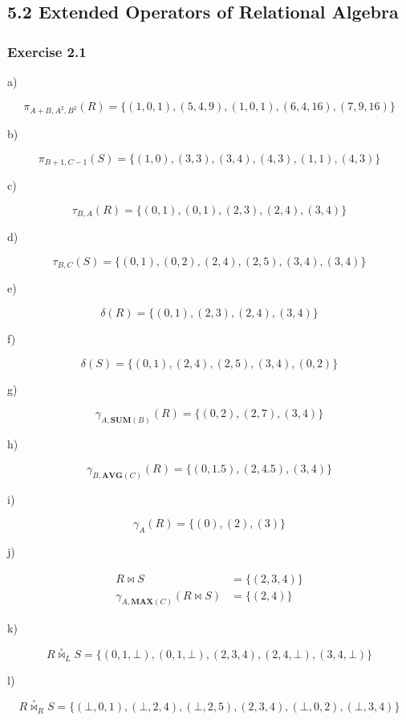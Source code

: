 \documentclass[../../main.tex]{subfiles}
\begin{document}
\subsection*{5.2 Extended Operators of Relational Algebra}

\subsubsection*{Exercise 2.1}

a)

$$
\pi_{A + B, A^2, B^2}(R) = \{(1, 0, 1), (5, 4, 9),
  (1, 0, 1), (6, 4, 16), (7, 9, 16)\}
$$

b)

$$
\pi_{B + 1, C - 1}(S) = \{(1, 0), (3, 3), (3, 4),
  (4, 3), (1, 1), (4, 3)\}
$$

c)

$$
\tau_{B, A}(R) = \{(0, 1), (0, 1), (2, 3),
  (2, 4), (3, 4)\}
$$

d)

$$
\tau_{B, C}(S) = \{(0, 1), (0, 2), (2, 4),
  (2, 5), (3, 4), (3, 4)\}
$$

e)

$$
\delta(R) = \{(0, 1), (2, 3), (2, 4), (3, 4)\}
$$

f)

$$
\delta(S) = \{(0, 1), (2, 4), (2, 5),
  (3, 4), (0, 2)\}
$$

g)

$$
\gamma_{A, \mathbf{SUM}(B)}(R) = \{(0, 2), (2, 7),
  (3, 4)\}
$$

h)

$$
\gamma_{B, \mathbf{AVG}(C)}(R) = \{(0, 1.5), (2, 4.5),
  (3, 4)\}
$$

i)

$$
\gamma_{A}(R) = \{(0), (2), (3)\}
$$

j)

\begin{align*}
  R \bowtie S &= \{(2, 3 , 4)\} \\
  \gamma_{A, \mathbf{MAX}(C)}(R \bowtie S) &= \{(2, 4)\}
\end{align*}

k)

$$
R \overset{\circ}{\bowtie}_{L} S = \{(0, 1, \bot),
  (0, 1, \bot), (2, 3, 4), (2, 4, \bot), (3, 4, \bot)\}
$$

l)

$$
R \overset{\circ}{\bowtie}_{R} S = \{(\bot, 0 , 1),
  (\bot, 2 , 4), (\bot, 2, 5), (2, 3, 4), (\bot, 0, 2),
  (\bot, 3, 4)\}
$$
\end{document}
